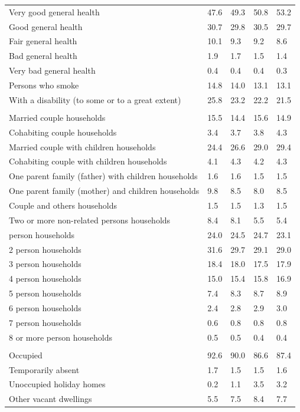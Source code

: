 \documentclass{article}
\begin{document}
\begin{table}[h]
\begin{tabular}{KTTTT}
    \hline
Very good general health & 47.6& 49.3&50.8& 53.2\\
Good general health & 30.7& 29.8& 30.5& 29.7\\
Fair general health & 10.1&  9.3& 9.2&  8.6\\
Bad general health & 1.9& 1.7&1.5& 1.4\\
Very bad general health & 0.4& 0.4&0.4& 0.3\\
    \hline
Persons who smoke & 14.8& 14.0&13.1& 13.1\\
    \hline
With a disability (to some or to a great extent) & 25.8& 23.2&22.2& 21.5\\
\hline
    \\ 
    \hline
Married couple households & 15.5& 14.4& 15.6& 14.9\\
Cohabiting couple households & 3.4& 3.7& 3.8& 4.3\\
Married couple with children households & 24.4& 26.6& 29.0& 29.4\\
Cohabiting couple with children households & 4.1& 4.3& 4.2& 4.3\\
One parent family (father) with  children households & 1.6& 1.6& 1.5& 1.5\\
One parent family (mother) and children households & 9.8& 8.5& 8.0& 8.5\\
Couple and others households  & 1.5& 1.5& 1.3& 1.5\\
Two or more non-related persons households & 8.4& 8.1& 5.5& 5.4\\
     person households & 24.0& 24.5& 24.7& 23.1\\
2 person households & 31.6& 29.7& 29.1& 29.0\\
3 person households & 18.4& 18.0& 17.5& 17.9\\
4 person households & 15.0& 15.4& 15.8& 16.9\\
5 person households & 7.4& 8.3& 8.7& 8.9\\
6 person households & 2.4& 2.8& 2.9& 3.0\\
7 person households & 0.6& 0.8& 0.8& 0.8\\
8 or more person households & 0.5& 0.5& 0.4& 0.4\\
\hline
    \\ 
    \hline
Occupied & 92.6& 90.0& 86.6& 87.4\\
Temporarily absent & 1.7& 1.5& 1.5& 1.6\\
Unoccupied holiday homes & 0.2& 1.1& 3.5& 3.2\\
Other vacant dwellings & 5.5& 7.5& 8.4& 7.7\\
\hline
\end{tabular}
\end{table}
\end{document}
